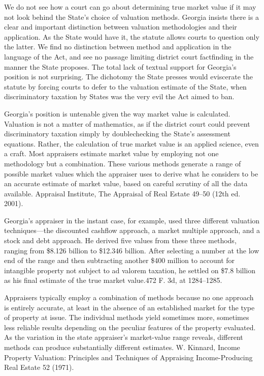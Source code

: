   We do not see how a court can go about determining true market value if it may not look behind the State's choice of valuation methods. Georgia insists there is a clear and important distinction between valuation methodologies and their application. As the State would have it, the statute allows courts to question only the latter. We find no distinction between method and application in the language of the Act, and see no passage limiting district court factfinding in the manner the State proposes. The total lack of textual support for Georgia's position is not surprising. The dichotomy the State presses would eviscerate the statute by forcing courts to defer to the valuation estimate of the State, when discriminatory taxation by States was the very evil the Act aimed to ban.

  Georgia's position is untenable given the way market value is calculated. Valuation is not a matter of mathematics, as if the district court could prevent discriminatory taxation \newpage  simply by doublechecking the State's assessment equations. Rather, the calculation of true market value is an applied science, even a craft. Most appraisers estimate market value by employing not one methodology but a combination. These various methods generate a range of possible market values which the appraiser uses to derive what he considers to be an accurate estimate of market value, based on careful scrutiny of all the data available. Appraisal Institute, The Appraisal of Real Estate 49--50 (12th ed. 2001).

  Georgia's appraiser in the instant case, for example, used three different valuation techniques---the discounted cashflow approach, a market multiple approach, and a stock and debt approach. He derived five values from these three methods, ranging from \$8.126 billion to \$12.346 billion. After selecting a number at the low end of the range and then subtracting another \$400 million to account for intangible property not subject to ad valorem taxation, he settled on \$7.8 billion as his final estimate of the true market value.472 F. 3d, at 1284--1285.

  Appraisers typically employ a combination of methods because no one approach is entirely accurate, at least in the absence of an established market for the type of property at issue. The individual methods yield sometimes more, sometimes less reliable results depending on the peculiar features of the property evaluated. As the variation in the state appraiser's market-value range reveals, different methods can produce substantially different estimates. W. Kinnard, Income Property Valuation: Principles and Techniques of Appraising Income-Producing Real Estate 52 (1971).

